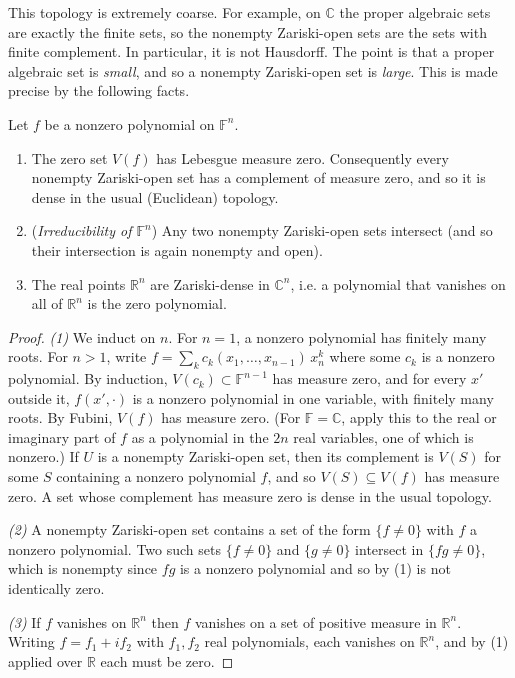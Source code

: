   This topology is extremely coarse. For example, on $\mathbb{C}$ the proper algebraic sets are exactly the finite sets, so the nonempty Zariski-open sets are the sets with finite complement. In particular, it is not Hausdorff. The point is that a proper algebraic set is \textit{small}, and so a nonempty Zariski-open set is \textit{large}. This is made precise by the following facts. 

  \begin{lemma}
    \label{lem:zariski-large}
    Let $f$ be a nonzero polynomial on $\mathbb{F}^n$. 
    \begin{enumerate}
      \item The zero set $V(f)$ has Lebesgue measure zero. Consequently every nonempty Zariski-open set has a complement of measure zero, and so it is dense in the usual (Euclidean) topology. 
      \item (\textit{Irreducibility of $\mathbb{F}^n$}) Any two nonempty Zariski-open sets intersect (and so their intersection is again nonempty and open). 
      \item The real points $\mathbb{R}^n$ are Zariski-dense in $\mathbb{C}^n$, i.e. a polynomial that vanishes on all of $\mathbb{R}^n$ is the zero polynomial. 
    \end{enumerate}
  \end{lemma}
  \begin{proof}
    \textit{(1)} We induct on $n$. For $n = 1$, a nonzero polynomial has finitely many roots. For $n > 1$, write $f = \sum_k c_k(x_1, \ldots, x_{n-1}) \, x_n^k$ where some $c_k$ is a nonzero polynomial. By induction, $V(c_k) \subset \mathbb{F}^{n-1}$ has measure zero, and for every $x'$ outside it, $f(x', \cdot)$ is a nonzero polynomial in one variable, with finitely many roots. By Fubini, $V(f)$ has measure zero. (For $\mathbb{F} = \mathbb{C}$, apply this to the real or imaginary part of $f$ as a polynomial in the $2n$ real variables, one of which is nonzero.) If $U$ is a nonempty Zariski-open set, then its complement is $V(S)$ for some $S$ containing a nonzero polynomial $f$, and so $V(S) \subseteq V(f)$ has measure zero. A set whose complement has measure zero is dense in the usual topology. 

    \textit{(2)} A nonempty Zariski-open set contains a set of the form $\{f \neq 0\}$ with $f$ a nonzero polynomial. Two such sets $\{f \neq 0\}$ and $\{g \neq 0\}$ intersect in $\{fg \neq 0\}$, which is nonempty since $fg$ is a nonzero polynomial and so by (1) is not identically zero. 

    \textit{(3)} If $f$ vanishes on $\mathbb{R}^n$ then $f$ vanishes on a set of positive measure in $\mathbb{R}^n$. Writing $f = f_1 + i f_2$ with $f_1, f_2$ real polynomials, each vanishes on $\mathbb{R}^n$, and by (1) applied over $\mathbb{R}$ each must be zero. 
  \end{proof}

